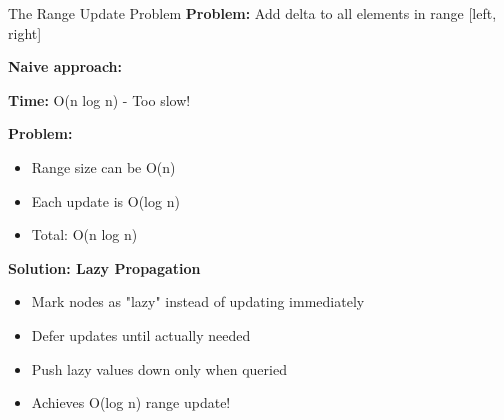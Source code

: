 \documentclass[aspectratio=169]{beamer}
\begin{document}
\begin{frame}{The Range Update Problem}
  \textbf{Problem:} Add delta to all elements in range [left, right]

  \vspace{0.5cm}
  \textbf{Naive approach:}

  \textbf{Time:} O(n log n) - Too slow!

  \vspace{0.5cm}
  \textbf{Problem:}
  \begin{itemize}
    \item Range size can be O(n)
    \item Each update is O(log n)
    \item Total: O(n log n)
  \end{itemize}

  \vspace{0.5cm}
  \textbf{Solution: Lazy Propagation}
  \begin{itemize}
    \item Mark nodes as "lazy" instead of updating immediately
    \item Defer updates until actually needed
    \item Push lazy values down only when queried
    \item Achieves O(log n) range update!
  \end{itemize}
\end{frame}
\end{document}
